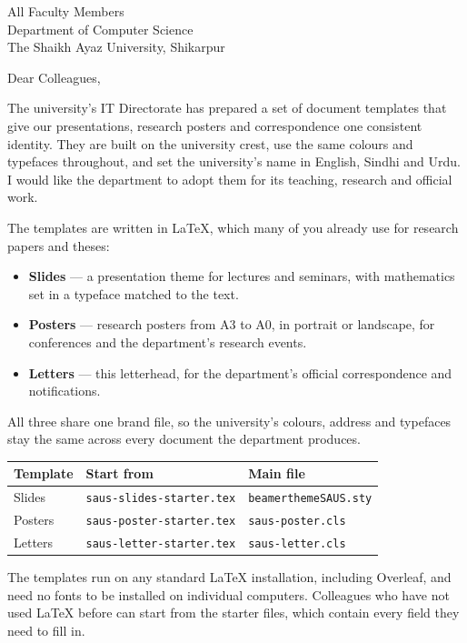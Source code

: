 \documentclass[sign=1,closing=left]{saus-letter}
\begin{document}
\begin{letter}{%
  All Faculty Members\\
  Department of Computer Science\\
  The Shaikh Ayaz University, Shikarpur}

\opening{Dear Colleagues,}

The university's IT Directorate has prepared a set of document templates that
give our presentations, research posters and correspondence one consistent
identity. They are built on the university crest, use the same colours and
typefaces throughout, and set the university's name in English, Sindhi and
Urdu. I would like the department to adopt them for its teaching, research and
official work.

The templates are written in \LaTeX{}, which many of you already use for
research papers and theses:

\begin{itemize}
  \item \textbf{Slides} --- a presentation theme for lectures and seminars, with
        mathematics set in a typeface matched to the text.
  \item \textbf{Posters} --- research posters from A3 to A0, in portrait or
        landscape, for conferences and the department's research events.
  \item \textbf{Letters} --- this letterhead, for the department's official
        correspondence and notifications.
\end{itemize}

All three share one brand file, so the university's colours, address and
typefaces stay the same across every document the department produces.

\begin{center}
\begin{tabular}{@{}lll@{}}
  \toprule
  \textbf{Template} & \textbf{Start from} & \textbf{Main file} \\
  \midrule
  Slides  & \texttt{saus-slides-starter.tex} & \texttt{beamerthemeSAUS.sty} \\
  Posters & \texttt{saus-poster-starter.tex} & \texttt{saus-poster.cls} \\
  Letters & \texttt{saus-letter-starter.tex} & \texttt{saus-letter.cls} \\
  \bottomrule
\end{tabular}
\end{center}

The templates run on any standard \LaTeX{} installation, including Overleaf,
and need no fonts to be installed on individual computers. Colleagues who have
not used \LaTeX{} before can start from the starter files, which contain every
field they need to fill in.


\end{letter}
\end{document}
